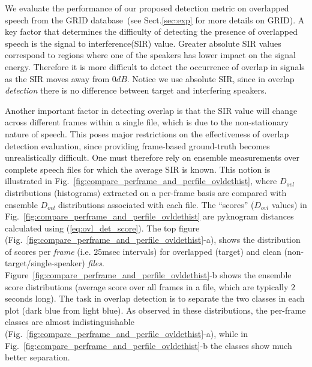 {We evaluate the performance of our proposed detection metric on overlapped speech from the GRID database~\cite{SSC_link}(see Sect.\ref{sec:exp} for more details on GRID). 
A key factor that determines the difficulty of detecting the presence of overlapped speech is the signal to interference(SIR) value. 
Greater absolute SIR values correspond to regions where one of the speakers has lower impact on the signal energy. 
Therefore it is more difficult to detect the occurrence of overlap in signals as the SIR moves away from $0dB$. 
Notice we use absolute SIR, since in overlap {\it detection} there is no difference between target and interfering speakers. 

Another important factor in detecting overlap is that the SIR value will change across different frames within a single file, which is due to the non-stationary nature of speech. 
This poses major restrictions on the effectiveness of overlap detection evaluation, since providing frame-based ground-truth becomes unrealistically difficult. 
One must therefore rely on ensemble measurements over complete speech files for which the average SIR is known. 
This notion is illustrated in Fig.~\ref{fig:compare_perframe_and_perfile_ovldethist}, where $D_{ovl}$ distributions (histograms) extracted on a per-frame basis are compared with ensemble $D_{ovl}$ distributions associated with each file. 
The ``scores'' ($D_{ovl}$ values) in Fig.~\ref{fig:compare_perframe_and_perfile_ovldethist} are pyknogram distances calculated using (\ref{eq:ovl_det_score}). 
The top figure (Fig.~\ref{fig:compare_perframe_and_perfile_ovldethist}-a), shows the distribution of scores per {\it frame} (i.e. $25$msec intervals) for overlapped (target) and clean (non-target/single-speaker) {\it files}.  
Figure~\ref{fig:compare_perframe_and_perfile_ovldethist}-b shows the ensemble score distributions (average score over all frames in a file, which are typically $2$ seconds long). 
The task in overlap detection is to separate the two classes in each plot (dark blue from light blue). 
As observed in these distributions, the per-frame classes are almost indistinguishable (Fig.~\ref{fig:compare_perframe_and_perfile_ovldethist}-a), while in Fig.~\ref{fig:compare_perframe_and_perfile_ovldethist}-b the classes show much better separation. 


}

